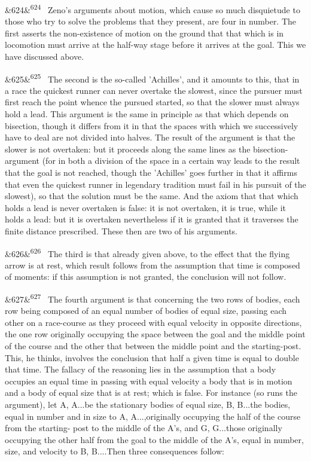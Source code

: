 \documentclass[12pt]{article}
\newcommand{\para}[1][]{\par\noindent\ifx&#1&\else\textsuperscript{\footnotesize #1}~\fi}
\begin{document}
\para[624] Zeno's arguments about motion, which cause so much disquietude to those who try to solve the problems that they present, are four in number. The first asserts the non-existence of motion on the ground that that which is in locomotion must arrive at the half-way stage before it arrives at the goal. This we have discussed above.

\para[625] The second is the so-called 'Achilles', and it amounts to this, that in a race the quickest runner can never overtake the slowest, since the pursuer must first reach the point whence the pursued started, so that the slower must always hold a lead. This argument is the same in principle as that which depends on bisection, though it differs from it in that the spaces with which we successively have to deal are not divided into halves. The result of the argument is that the slower is not overtaken: but it proceeds along the same lines as the bisection-argument (for in both a division of the space in a certain way leads to the result that the goal is not reached, though the 'Achilles' goes further in that it affirms that even the quickest runner in legendary tradition must fail in his pursuit of the slowest), so that the solution must be the same. And the axiom that that which holds a lead is never overtaken is false: it is not overtaken, it is true, while it holds a lead: but it is overtaken nevertheless if it is granted that it traverses the finite distance prescribed. These then are two of his arguments.

\para[626] The third is that already given above, to the effect that the flying arrow is at rest, which result follows from the assumption that time is composed of moments: if this assumption is not granted, the conclusion will not follow.

\para[627] The fourth argument is that concerning the two rows of bodies, each row being composed of an equal number of bodies of equal size, passing each other on a race-course as they proceed with equal velocity in opposite directions, the one row originally occupying the space between the goal and the middle point of the course and the other that between the middle point and the starting-post. This, he thinks, involves the conclusion that half a given time is equal to double that time. The fallacy of the reasoning lies in the assumption that a body occupies an equal time in passing with equal velocity a body that is in motion and a body of equal size that is at rest; which is false. For instance (so runs the argument), let A, A...be the stationary bodies of equal size, B, B...the bodies, equal in number and in size to A, A...,originally occupying the half of the course from the starting- post to the middle of the A's, and G, G...those originally occupying the other half from the goal to the middle of the A's, equal in number, size, and velocity to B, B....Then three consequences follow:
\end{document}
